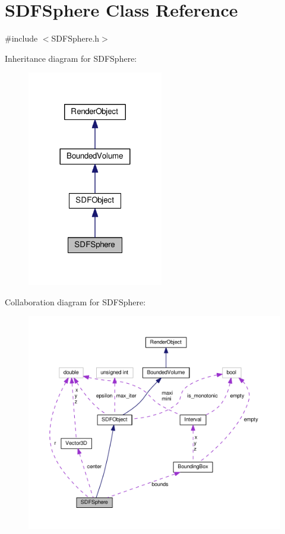 \hypertarget{classSDFSphere}{}\section{S\+D\+F\+Sphere Class Reference}
\label{classSDFSphere}


{\ttfamily \#include $<$S\+D\+F\+Sphere.\+h$>$}



Inheritance diagram for S\+D\+F\+Sphere\+:
\nopagebreak
\begin{figure}[H]
\begin{center}
\leavevmode
\includegraphics[width=168pt]{classSDFSphere__inherit__graph}
\end{center}
\end{figure}


Collaboration diagram for S\+D\+F\+Sphere\+:
\nopagebreak
\begin{figure}[H]
\begin{center}
\leavevmode
\includegraphics[width=350pt]{classSDFSphere__coll__graph}
\end{center}
\end{figure}
